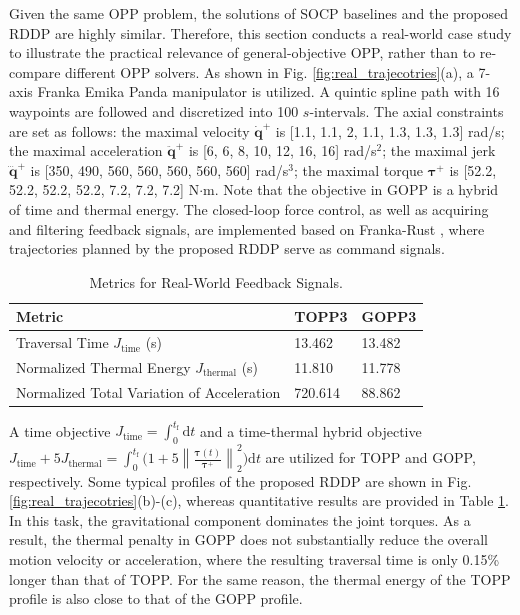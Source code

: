 \documentclass[journal]{IEEEtran}
\theoremstyle{definition}
\theoremstyle{definition}
\newcommand\norm[2][1]{\left\|#2\right\|_{#1}}
\renewcommand\vector[1]{\boldsymbol{#1}}
\newcommand\vq{{\vector{q}}}
\newcommand\vtau{{\vector{\tau}}}
\newcommand\f{{\text{f}}}
\begin{document}
Given the same OPP problem, the solutions of SOCP baselines and the proposed RDDP are highly similar. Therefore, this section conducts a real-world case study to illustrate the practical relevance of general-objective OPP, rather than to re-compare different OPP solvers. As shown in Fig. \ref{fig:real_trajecotries}(a), a 7-axis Franka Emika Panda manipulator is utilized. A quintic spline path with 16 waypoints are followed and discretized into 100 $s$-intervals. The axial constraints are set as follows: the maximal velocity $\dot{\vq}^+$ is [1.1, 1.1, 2, 1.1, 1.3, 1.3, 1.3] rad/s; the maximal acceleration $\ddot{\vq}^+$ is [6, 6, 8, 10, 12, 16, 16] rad/s${}^\text{2}$; the maximal jerk $\dddot{\vq}^+$ is [350, 490, 560, 560, 560, 560, 560] rad/s${}^\text{3}$; the maximal torque $\vtau^+$ is [52.2, 52.2, 52.2, 52.2, 7.2, 7.2, 7.2] N$\cdot$m. Note that the objective in GOPP is a hybrid of time and thermal energy. The closed-loop force control, as well as acquiring and filtering feedback signals, are implemented based on Franka-Rust \cite{Jizhou2025FrankaRust}, where trajectories planned by the proposed RDDP serve as command signals.

\begin{table}[!t]
    \centering
    \caption{Metrics for Real-World Feedback Signals.}
    \label{tab:real_world}
    \begin{tabular}{lll}
        \toprule
        Metric & TOPP3 & GOPP3 \\ \midrule
        Traversal Time $J_\text{time}$ (s) & 13.462 & 13.482 \\
        Normalized Thermal Energy $J_\text{thermal}$ (s) & 11.810 & 11.778 \\
        Normalized Total Variation of Acceleration & 720.614 & 88.862 \\ \bottomrule
    \end{tabular}
\end{table}

A time objective $J_{\text{time}}=\int_{0}^{t_\f}\mathrm{d}t$ and a time-thermal hybrid objective $J_{\text{time}}+5J_{\text{thermal}}=\int_{0}^{t_\f}\Big(1+5\norm[2]{\frac{\vtau(t)}{\vtau^+}}^2\Big)\mathrm{d}t$ are utilized for TOPP and GOPP, respectively. Some typical profiles of the proposed RDDP are shown in Fig. \ref{fig:real_trajecotries}(b)-(c), whereas quantitative results are provided in Table \ref{tab:real_world}. In this task, the gravitational component dominates the joint torques. As a result, the thermal penalty in GOPP does not substantially reduce the overall motion velocity or acceleration, where the resulting traversal time is only 0.15\% longer than that of TOPP. For the same reason, the thermal energy of the TOPP profile is also close to that of the GOPP profile.
\end{document}
